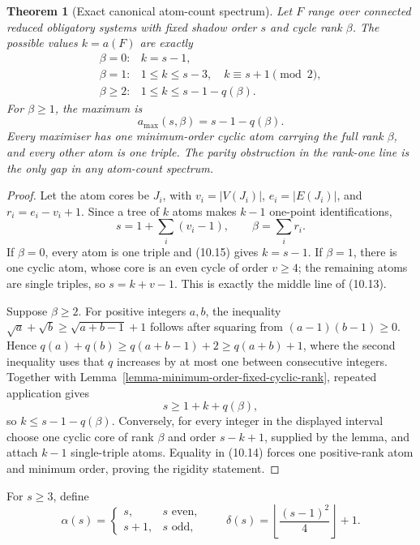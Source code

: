 \documentclass[a4paper,11pt,reqno]{amsart}
\theoremstyle{plain}
\newtheorem{theorem}{Theorem}[section]
\theoremstyle{definition}
\theoremstyle{remark}
\begin{document}
\begin{theorem}[Exact canonical atom-count spectrum]
\label{theorem-exact-canonical-atom-count-spectrum}
Let $F$ range over connected reduced obligatory systems with fixed shadow
order $s$ and cycle rank $\beta$.  The possible values $k=a(F)$ are exactly
\[
\begin{array}{ll}
\beta=0:
  & k=s-1,\\[1mm]
\beta=1:
  & 1\le k\le s-3,\quad k\equiv s+1\pmod 2,\\[1mm]
\beta\ge2:
  & 1\le k\le s-1-q(\beta).
\end{array}
\tag{10.13}
\]
For $\beta\ge1$, the maximum is
\[
a_{\max}(s,\beta)=s-1-q(\beta).
\tag{10.14}
\]
Every maximiser has one minimum-order cyclic atom carrying the full rank
$\beta$, and every other atom is one triple.  The parity obstruction in the
rank-one line is the only gap in any atom-count spectrum.
\end{theorem}
\begin{proof}
Let the atom cores be $J_i$, with $v_i=|V(J_i)|$,
$e_i=|E(J_i)|$, and $r_i=e_i-v_i+1$.  Since a tree of $k$ atoms makes
$k-1$ one-point identifications,
\[
s=1+\sum_i(v_i-1),
\qquad
\beta=\sum_i r_i.
\tag{10.15}
\]
If $\beta=0$, every atom is one triple and (10.15) gives $k=s-1$.
If $\beta=1$, there is one cyclic atom, whose core is an even cycle of order
$v\ge4$; the remaining atoms are single triples, so
$s=k+v-1$.  This is exactly the middle line of (10.13).

Suppose $\beta\ge2$.  For positive integers $a,b$, the inequality
$\sqrt a+\sqrt b\ge\sqrt{a+b-1}+1$ follows after squaring from
$(a-1)(b-1)\ge0$.  Hence
$q(a)+q(b)\ge q(a+b-1)+2\ge q(a+b)+1$, where the second
inequality uses that $q$ increases by at most one between consecutive integers.
Together with Lemma~\ref{lemma-minimum-order-fixed-cyclic-rank}, repeated
application gives
\[
s\ge1+k+q(\beta),
\]
so $k\le s-1-q(\beta)$.  Conversely, for every integer in the displayed
interval choose one cyclic core of rank $\beta$ and order $s-k+1$, supplied by
the lemma, and attach $k-1$ single-triple atoms.  Equality in (10.14) forces
one positive-rank atom and minimum order, proving the rigidity statement.
\end{proof}

For $s\ge3$, define
\[
\alpha(s)=
\begin{cases}
s,&s\text{ even},\\
s+1,&s\text{ odd},
\end{cases}
\qquad
\delta(s)=\left\lfloor\frac{(s-1)^2}{4}\right\rfloor+1.
\]
\end{document}
